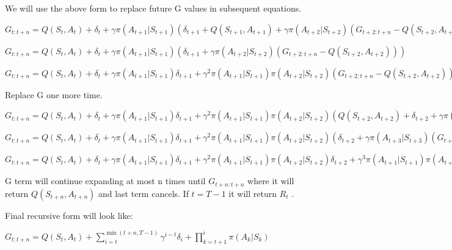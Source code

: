 \documentclass[11pt]{article}
\begin{document}
    We will use the above form to replace future G values in subsequent equations.

    \noindent $ G_{t:t+n} = Q(S_{t},A_{t}) + \delta_{t} + \gamma \pi(A_{t+1}|S_{t+1})( \delta_{t+1} + Q(S_{t+1},A_{t+1}) + \gamma \pi(A_{t+2}|S_{t+2})( G_{t+2:t+n} - Q(S_{t+2},A_{t+2})) - Q(S_{t+1},A_{t+1}) ) $

    \noindent $ G_{t:t+n} = Q(S_{t},A_{t}) + \delta_{t} + \gamma \pi(A_{t+1}|S_{t+1})( \delta_{t+1} + \gamma \pi(A_{t+2}|S_{t+2})( G_{t+2:t+n} - Q(S_{t+2},A_{t+2})) ) $

    \noindent $ G_{t:t+n} = Q(S_{t},A_{t}) + \delta_{t} + \gamma \pi(A_{t+1}|S_{t+1}) \delta_{t+1} +\gamma^2 \pi(A_{t+1}|S_{t+1}) \pi(A_{t+2}|S_{t+2})( G_{t+2:t+n} - Q(S_{t+2},A_{t+2}))  $


    Replace G one more time.

    \noindent $ G_{t:t+n} = Q(S_{t},A_{t}) + \delta_{t} + \gamma \pi(A_{t+1}|S_{t+1}) \delta_{t+1} +\gamma^2 \pi(A_{t+1}|S_{t+1}) \pi(A_{t+2}|S_{t+2})( Q(S_{t+2},A_{t+2}) + \delta_{t+2} + \gamma \pi(A_{t+3}|S_{t+3})( G_{t+3:t+n} - Q(S_{t+3},A_{t+3})) - Q(S_{t+2},A_{t+2}))  $

    \noindent $ G_{t:t+n} = Q(S_{t},A_{t}) + \delta_{t} + \gamma \pi(A_{t+1}|S_{t+1}) \delta_{t+1} +\gamma^2 \pi(A_{t+1}|S_{t+1}) \pi(A_{t+2}|S_{t+2})( \delta_{t+2} + \gamma \pi(A_{t+3}|S_{t+3})( G_{t+3:t+n} - Q(S_{t+3},A_{t+3})))  $

    \noindent $ G_{t:t+n} = Q(S_{t},A_{t}) + \delta_{t} + \gamma \pi(A_{t+1}|S_{t+1}) \delta_{t+1} + \gamma^2 \pi(A_{t+1}|S_{t+1}) \pi(A_{t+2}|S_{t+2}) \delta_{t+2} + \gamma^3 \pi(A_{t+1}|S_{t+1}) \pi(A_{t+2}|S_{t+2}) \pi(A_{t+3}|S_{t+3})( G_{t+3:t+n} - Q(S_{t+3},A_{t+3}))  $

    G term will continue expanding at most n times until $ G_{t+n:t+n} $  where it will return $ Q(S_{t+n}, A_{t+n}) $ and last term cancels.
    If $ t=T-1$ it will return $R_t$ .

    Final recursive form will look like:

    \noindent $ G_{t:t+n} = Q(S_{t},A_{t}) + \sum_{i=t}^{\min(t+n,T-1)} \gamma^{i-t} \delta_{i} + \prod_{k=t+1}^{i} \pi(A_{k}|S_{k})   $
\end{document}
